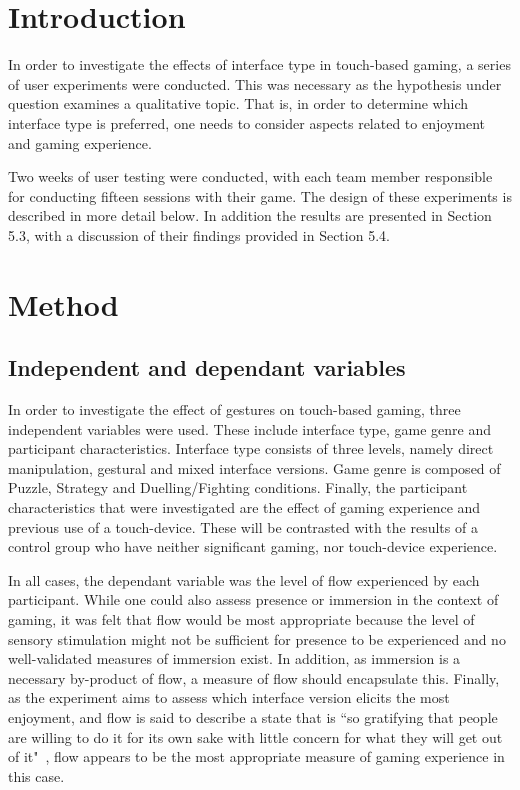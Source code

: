 \section{Introduction}
In order to investigate the effects of interface type in touch-based gaming, a series of user experiments were conducted. This was necessary as the hypothesis under question examines a qualitative topic. That is, in order to determine which interface type is preferred, one needs to consider aspects related to enjoyment and gaming experience. 

Two weeks of user testing were conducted, with each team member responsible for conducting fifteen sessions with their game. The design of these experiments is described in more detail below. In addition the results are presented in Section 5.3, with a discussion of their findings provided in Section 5.4.


\section{Method}

\subsection{Independent and dependant variables}
In order to investigate the effect of gestures on touch-based gaming, three independent variables were used. These include interface type, game genre and participant characteristics. Interface type consists of three levels, namely direct manipulation, gestural and mixed interface versions. Game genre is composed of Puzzle, Strategy and Duelling/Fighting conditions. Finally, the participant characteristics that were investigated are the effect of gaming experience and previous use of a touch-device. These will be contrasted with the results of a control group who have neither significant gaming, nor touch-device experience.

In all cases, the dependant variable was the level of flow experienced by each participant. While one could also assess presence or immersion in the context of gaming, it was felt that flow would be most appropriate because the level of sensory stimulation might not be sufficient for presence to be experienced and no well-validated measures of immersion exist. In addition, as immersion is a necessary by-product of flow, a measure of flow should encapsulate this. Finally, as the experiment aims to assess which interface version elicits the most enjoyment, and flow is said to describe a state that is ``so gratifying that people are willing to do it for its own sake with little concern for what they will get out of it"~\citep{Csik90}, flow appears to be the most appropriate measure of gaming experience in this case.

